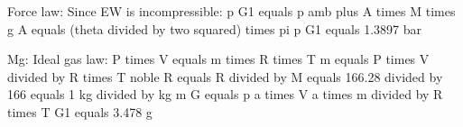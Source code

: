 Force law:  
Since EW is incompressible: p G1 equals p amb plus A times M times g  
A equals (theta divided by two squared) times pi  
p G1 equals 1.3897 bar  

Mg: Ideal gas law:  
P times V equals m times R times T  
m equals P times V divided by R times T  
noble R equals R divided by M equals 166.28 divided by 166 equals 1 kg divided by kg  
m G equals p a times V a times m divided by R times T G1 equals 3.478 g